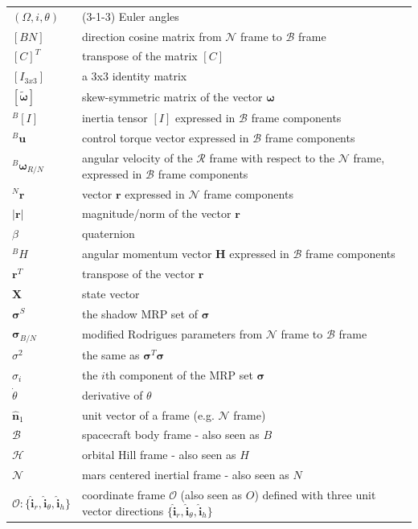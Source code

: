 \documentclass[conf]{new-aiaa}
\begin{document}
{\renewcommand\arraystretch{1.0}
\noindent\begin{longtable*}{@{}l @{\quad=\quad} l@{}}
$(\Omega,i,\theta)$  & (3-1-3) Euler angles \\
$[BN]$ & direction cosine matrix from $\mathcal{N}$ frame to $\mathcal{B}$ frame \\
$[C]^T$ & transpose of the matrix $[C]$ \\ 
$[I_{3x3}]$ & a 3x3 identity matrix \\
$[\tilde{\bm\omega}]$ & skew-symmetric matrix of the vector $\bm\omega$ \\
${}^B[I]$  & inertia tensor $[I]$ expressed in $\mathcal{B}$ frame components \\
${}^B\bm u$ & control torque vector expressed in $\mathcal{B}$ frame components \\
${}^B\bm\omega_{R/N}$ & angular velocity of the $\mathcal{R}$ frame with respect to the $\mathcal{N}$ frame, expressed in $\mathcal{B}$ frame components \\
${}^N\bm r$ & vector $\bm r$ expressed in $\mathcal{N}$ frame components \\
$|\bm r|$ & magnitude/norm of the vector $\bm r$ \\ 
$\beta$ & quaternion \\
$\bm {}^BH$   & angular momentum vector $\bm H$ expressed in $\mathcal{B}$ frame components \\
$\bm r^T$ & transpose of the vector $\bm r$ \\ 
$\bm X$ & state vector \\
$\bm\sigma^S$ & the shadow MRP set of $\bm\sigma$ \\
$\bm\sigma_{B/N}$ & modified Rodrigues parameters from $\mathcal{N}$ frame to $\mathcal{B}$ frame \\
$\sigma^2$ & the same as $\bm\sigma^T\bm\sigma$\\
$\sigma_i$ & the $i$th component of the MRP set $\bm\sigma$ \\
$\dot\theta$ & derivative of $\theta$ \\
$\hat{\bm n}_1$ & unit vector of a frame (e.g. $\mathcal{N}$ frame) \\
$\mathcal{B}$ & spacecraft body frame - also seen as $B$ \\
$\mathcal{H}$ & orbital Hill frame - also seen as $H$ \\
$\mathcal{N}$ & mars centered inertial frame - also seen as $N$ \\
$\mathcal{O} : \{{\hat{\bm{i}}_r, \hat{\bm{i}}_{\theta}, \hat{\bm{i}}_h}\}$ & coordinate frame $\mathcal{O}$ (also seen as $O$) defined with three unit vector directions $\{{\hat{\bm{i}}_r, \hat{\bm{i}}_{\theta}, \hat{\bm{i}}_h}\}$ \\

\end{longtable*}}
\end{document}
